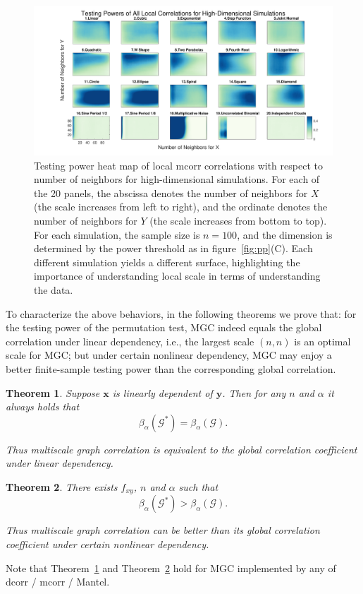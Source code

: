 \documentclass[11pt]{article}
\providecommand{\mb}[1]{\boldsymbol{#1}}
\newcommand{\G}{\mathcal{G}}
\newtheorem{thm}{Theorem}
\begin{document}
\begin{figure}[htbp]
\includegraphics[width=1.0\textwidth]{Figures/Fig6}
\caption{Testing power heat map of local mcorr correlations with respect to number of neighbors for high-dimensional simulations.
For each of the 20 panels, the abscissa denotes the number of neighbors for $X$ (the scale increases from left to right), and the ordinate denotes the number of neighbors for $Y$ (the scale increases from bottom to top). For each simulation, the sample size is $n=100$, and the dimension is determined by the power threshold as in figure~\ref{fig:pp}(C). Each different simulation yields a different surface, highlighting the importance of understanding local scale in terms of understanding the data. }
\label{figSim6}
\end{figure}

To characterize the above behaviors, in the following theorems we prove that: for the testing power of the permutation test, MGC indeed equals the global correlation under linear dependency, i.e., the largest scale $(n,n)$ is an optimal scale for MGC; but under certain nonlinear dependency, MGC may enjoy a better finite-sample testing power than the corresponding global correlation. 

\begin{thm}
\label{thm2}
Suppose $\mb{x}$ is linearly dependent of $\mb{y}$. Then for any $n$ and $\alpha$ it always holds that
\begin{equation}
\beta_{\alpha}(\G^{*}) = \beta_{\alpha}(\G).
\end{equation}

Thus multiscale graph correlation is equivalent to the global correlation coefficient under linear dependency.
\end{thm}

\begin{thm}
\label{thm3}
There exists $f_{xy}$, $n$ and $\alpha$ such that 
\begin{equation}
\beta_{\alpha}(\G^{*}) > \beta_{\alpha}(\G).
\end{equation}

Thus multiscale graph correlation can be better than its global correlation coefficient under certain nonlinear dependency.
\end{thm}
Note that Theorem~\ref{thm2} and Theorem~\ref{thm3} hold for MGC implemented by any of dcorr / mcorr / Mantel.
\end{document}
